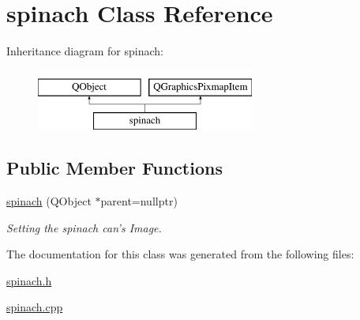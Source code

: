 \hypertarget{classspinach}{\section{spinach Class Reference}
\label{classspinach}
}
Inheritance diagram for spinach\-:\begin{figure}[H]
\begin{center}
\leavevmode
\includegraphics[height=2.000000cm]{classspinach}
\end{center}
\end{figure}
\subsection*{Public Member Functions}
\begin{DoxyCompactItemize}
\item 
\hypertarget{classspinach_aa673f40ede69591ff0e09e2228eafde4}{\hyperlink{classspinach_aa673f40ede69591ff0e09e2228eafde4}{spinach} (Q\-Object $\ast$parent=nullptr)}\label{classspinach_aa673f40ede69591ff0e09e2228eafde4}

\begin{DoxyCompactList}\small\item\em Setting the spinach can's Image. \end{DoxyCompactList}\end{DoxyCompactItemize}


The documentation for this class was generated from the following files\-:\begin{DoxyCompactItemize}
\item 
\hyperlink{spinach_8h}{spinach.\-h}\item 
\hyperlink{spinach_8cpp}{spinach.\-cpp}\end{DoxyCompactItemize}
